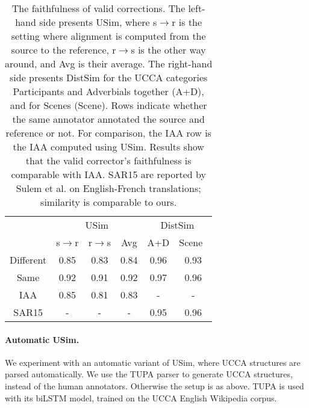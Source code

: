 \documentclass[a4paper, 11pt]{article}
\begin{document}
\begin{table}
  \small
  \centering
  \singlespacing
  \begin{tabular}{c|c|c|c||c|c|}
  	\cline{2-6} 
  	& \multicolumn{3}{c||}{\sc USim} & \multicolumn{2}{c|}{\sc DistSim}\\ \cline{2-6}
  	& s$\rightarrow$r & r$\rightarrow$s & Avg & A+D & Scene\
    \\
    \hline
    Different & 0.85 & 0.83 & 0.84 & 0.96 & 0.93
    \\
    Same & 0.92 & 0.91 & 0.92 & 0.97 & 0.96
    \\
    \hline
    \hline
    IAA & 0.85 & 0.81 & 0.83 & - & -
    \\
    \hline
    SAR15 & - & - & - & 0.95 & 0.96 \\
    \hline
  \end{tabular}
  \caption{\label{tab:Distances}
    The faithfulness of valid corrections.
    The left-hand side presents {\sc USim},
    where s$\rightarrow$r is the setting where alignment is computed from the source to the reference,
    r$\rightarrow$s is the other way around, and Avg is their average.
    The right-hand side presents {\sc DistSim} for the UCCA categories Participants and Adverbials
    together (A+D), and for Scenes (Scene).
    Rows indicate whether the same annotator annotated the source and reference or not.
    For comparison, the IAA row is the IAA computed using {\sc USim}.
    Results show that the valid corrector's faithfulness is comparable with IAA.
    SAR15 are reported by Sulem et al. on English-French
    translations; similarity is comparable to ours.}
\end{table}

\paragraph{Automatic {\sc USim}.}

We experiment with an automatic variant of {\sc USim}, where UCCA
structures are parsed automatically.
We use the TUPA parser \cite{hershcovich2017transition} to generate UCCA structures,
instead of the human annotators. Otherwise the setup is as above.
TUPA is used with its biLSTM model, trained on the UCCA English Wikipedia corpus.
\end{document}
